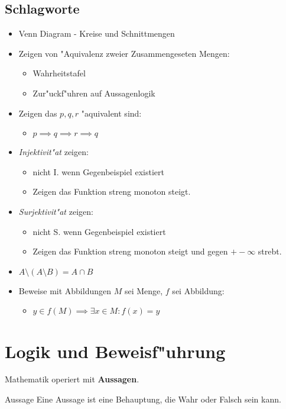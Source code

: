 \documentclass[11pt]{article}
\theoremstyle{remark}
\theoremstyle{definition}
\theoremstyle{remark}
\begin{document}
\subsection{Schlagworte}
\label{sec:org0cab6a2}
\begin{itemize}
\item Venn Diagram - Kreise und Schnittmengen
\item Zeigen von "Aquivalenz zweier Zusammengeseten Mengen:
\begin{itemize}
\item Wahrheitstafel
\item Zur"uckf"uhren auf Aussagenlogik
\end{itemize}
\item Zeigen das \(p,q,r\) "aquivalent sind:
\begin{itemize}
\item \(p\implies q \implies r \implies q\)
\end{itemize}
\item \emph{Injektivit"at} zeigen:
\begin{itemize}
\item nicht I. wenn Gegenbeispiel existiert
\item Zeigen das Funktion streng monoton steigt.
\end{itemize}
\item \emph{Surjektivit"at} zeigen:
\begin{itemize}
\item nicht S. wenn Gegenbeispiel existiert
\item Zeigen das Funktion streng monoton steigt und gegen \(+-\infty\) strebt.
\end{itemize}
\item \(A\setminus (A\setminus B) = A \cap B\)
\item Beweise mit Abbildungen \(M\) sei Menge, \(f\) sei Abbildung:
\begin{itemize}
\item \(y \in f(M) \implies \exists x \in M : f(x)=y\)
\end{itemize}
\end{itemize}

\section{Logik und Beweisf"uhrung}
\label{sec:orgc083250}
Mathematik operiert mit \textbf{Aussagen}.

\begin{definition}{Aussage}{}
Eine Aussage ist eine Behauptung, die Wahr oder Falsch sein kann.
\end{definition}
\end{document}

